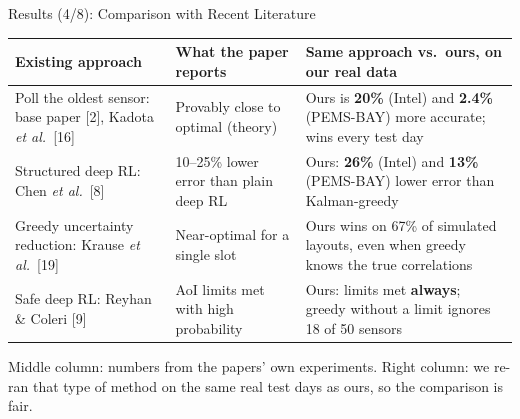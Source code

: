 \documentclass[aspectratio=169,10pt,xcolor=table]{beamer}
\newcommand{\good}[1]{{\color{good}\textbf{#1}}}
\renewcommand{\cite}[1]{{\color{muted}[#1]}}
\renewcommand{\arraystretch}{1.15}
\begin{document}
\begin{frame}{Results (4/8): Comparison with Recent Literature}
  \footnotesize
  \renewcommand{\arraystretch}{1.3}
  \begin{tabularx}{\textwidth}{@{}>{\raggedright\arraybackslash}p{3.0cm}YY@{}}
    \toprule
    \textbf{Existing approach} & \textbf{What the paper reports} & \textbf{Same approach vs.\ ours, on our real data} \\
    \midrule
    Poll the oldest sensor: base paper \cite{2}, Kadota \emph{et al.}\ \cite{16}
      & Provably close to optimal (theory)
      & Ours is \good{20\%} (Intel) and \good{2.4\%} (PEMS-BAY) more accurate; wins every test day \\
    Structured deep RL: Chen \emph{et al.}\ \cite{8}
      & 10--25\% lower error than plain deep RL
      & Ours: \good{26\%} (Intel) and \good{13\%} (PEMS-BAY) lower error than Kalman-greedy \\
    Greedy uncertainty reduction: Krause \emph{et al.}\ \cite{19}
      & Near-optimal for a single slot
      & Ours wins on 67\% of simulated layouts, even when greedy knows the true correlations \\
    Safe deep RL: Reyhan \& Coleri \cite{9}
      & AoI limits met with high probability
      & Ours: limits met \textbf{always}; greedy without a limit ignores 18 of 50 sensors \\
    \bottomrule
  \end{tabularx}
  \vspace{0.6em}

  {\scriptsize\color{muted} Middle column: numbers from the papers' own experiments. Right column: we re-ran that type of
  method on the same real test days as ours, so the comparison is fair.}
\end{frame}
\end{document}
